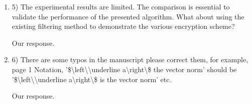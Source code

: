 \documentclass[a4paper]{scrartcl}
\newenvironment{rebuttal}{\begin{enumerate}[label={\color{grey}\thesection.\arabic{enumi}},leftmargin=0pt,ref=\thesection.\arabic{enumi}]}{\end{enumerate}}
\newcommand{\reviewtext}[1]{{\color{nblue} #1}}
\begin{document}
\begin{rebuttal}
\item \reviewtext{5) The experimental results are limited. The comparison is essential to validate the performance of the presented algorithm. What about using the existing filtering method to demonstrate the various encryption scheme?}

Our response.

\item \reviewtext{6) There are some typos in the manuscript please correct them, for example, page 1 Notation, '\$\textbackslash left\textbackslash\textbar\textbackslash underline a\textbackslash right\textbackslash\textbar\$ the vector norm' should be '\$\textbackslash left\textbackslash\textbar\textbackslash underline a\textbackslash right\textbackslash\textbar\$ is the vector norm' etc.}

Our response.

\end{rebuttal}

% 
\end{document}
